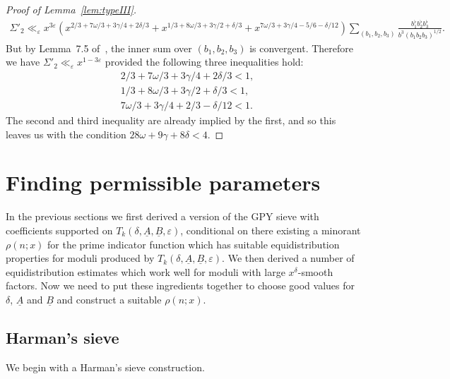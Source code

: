 \documentclass{amsart}
\numberwithin{equation}{section}
\begin{document}
\begin{proof}[Proof of Lemma~\ref{lem:typeIII}]
\begin{align*}
\Sigma'_2 \ll_\varepsilon x^{3\varepsilon} \left(   x^{2/3 +7\omega/3  +3\gamma/4  +2\delta/3 }        +
   x^{1/3 +8\omega/3  +3\gamma/2   +\delta/3 }    +   x^{7\omega/3  +3\gamma/4 - 5/6 -\delta/12    }        \right) \sum_{(b_1,b_2,b_3)} \frac{b_1^\flat b_2^\flat b_3^\flat}{b^3 (b_1b_2b_3)^{1/2} }.
\end{align*}
But by Lemma~7.5 of~\cite{Polymath:2014:EDZ}, the inner sum over $(b_1,b_2,b_3)$ is convergent. Therefore we have $\Sigma'_2 \ll_\varepsilon x^{1-3\varepsilon}$ provided the following three inequalities hold:
\begin{align*}
&2/3 +7\omega/3  +3\gamma/4  +2\delta/3  <1, \\
&1/3 +8\omega/3  +3\gamma/2   +\delta/3 <1, \\
&7\omega/3  +3\gamma/4 +2/3 -\delta/12  <1.
\end{align*}
The second and third inequality are already implied by the first, and so this leaves us with the condition $28\omega   +9\gamma   +8\delta   <4$.
\end{proof}

 



\section{Finding permissible parameters}\label{sec:domain}

In the previous sections we first derived a version of the GPY sieve with coefficients supported on $T_k(\delta,\underline{A},\underline{B},\varepsilon)$, conditional on there existing a minorant $\rho(n;x)$ for the prime indicator function which has suitable equidistribution properties for moduli produced by $T_k(\delta,\underline{A},\underline{B},\varepsilon)$. We then derived a number of equidistribution estimates which work well for moduli with large $x^\delta$-smooth factors. Now we need to put these ingredients together to choose good values for $\delta$, $\underline{A}$ and $ \underline{B}$ and construct a suitable $\rho(n;x)$. 

\subsection{Harman's sieve} We begin with a Harman's sieve construction. 
\end{document}
